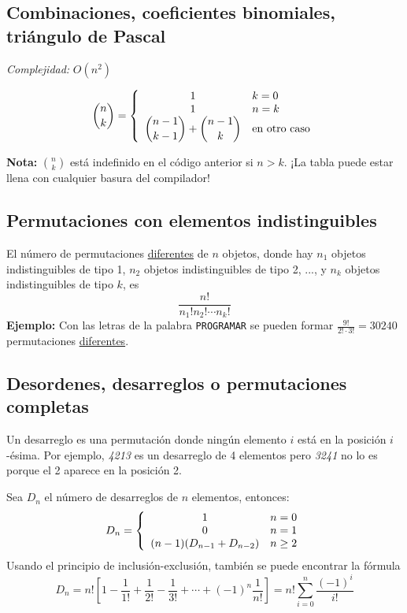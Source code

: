 \documentclass[10pt,letterpaper,twocolumn]{article}
\newcommand{\codigofuente}[1]{

\dotfill
}
\begin{document}
\subsection{Combinaciones, coeficientes binomiales, triángulo de Pascal}
\emph{Complejidad:} $ O(n^2) $

$$ \binom{n}{k} = \left\{
  \begin{array}{c l}
    1 & k = 0\\
    1 & n = k\\
    \displaystyle \binom{n - 1}{k - 1} + \binom{n - 1}{k} & \mbox{en otro caso}\\
  \end{array}
\right.
$$

\codigofuente{./src/combinatoria/pascal_triangle.cpp}

\bigskip
\textbf{Nota:} $ \binom{n}{k} $ está indefinido en el código anterior si $ n > k$. ¡La tabla puede estar llena con cualquier basura del compilador!

\subsection{Permutaciones con elementos indistinguibles}
El número de permutaciones \underline{diferentes} de $n$ objetos, donde hay $n_{1}$ objetos indistinguibles de tipo 1,
$n_{2}$ objetos indistinguibles de tipo 2, ..., y $n_{k}$ objetos indistinguibles de tipo $k$, es
$$
\frac{n!}{n_{1}!n_{2}! \cdots n_{k}!}
$$
\textbf{Ejemplo:} Con las letras de la palabra \texttt{PROGRAMAR} se pueden formar $ \displaystyle \frac{9!}{2! \cdot 3!} =
30240 $ permutaciones \underline{diferentes}.
\subsection{Desordenes, desarreglos o permutaciones completas}

Un desarreglo es una permutación donde ningún elemento $i$ está en la
posición $i$-ésima. Por ejemplo, \textit{4213} es un desarreglo de 4 elementos pero
\textit{3241} no lo es porque el 2 aparece en la posición 2.

Sea $D_{n}$ el número de desarreglos de $n$ elementos, entonces:
$$ {D_{n}} = \left\{
  \begin{array}{c l}
    1 & n = 0\\
    0 & n = 1\\
    (n-1)(D_{n-1} + D_{n-2}) & n \geq 2\\
  \end{array}
\right.
$$
Usando el principio de inclusión-exclusión, también se puede encontrar la fórmula
$$
D_{n} = n!\left [ 1 - \frac{1}{1!} + \frac{1}{2!} - \frac{1}{3!} + \cdots + (-1)^{n}\frac{1}{n!} \right ]
= n! \sum_{i=0}^{n} \frac{(-1)^{i}}{i!}
$$
\end{document}
